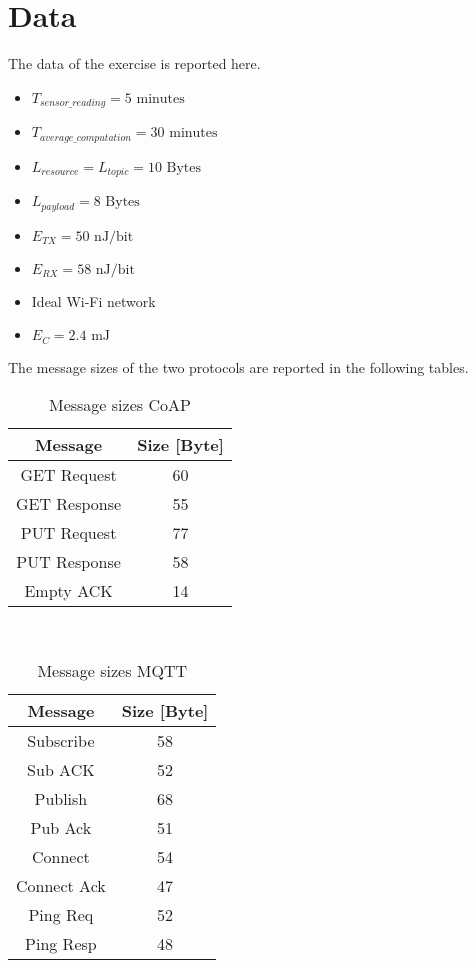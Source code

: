 \section{Data}

The data of the exercise is reported here.
\begin{itemize}
	\item $T_{sensor\_reading} = 5 \text{ minutes}$
	\item $T_{average\_computation} = 30 \text{ minutes}$
	\item $L_{resource} = L_{topic} = 10  \text{ Bytes}$
	\item $L_{payload} = 8  \text{ Bytes}$
	\item $E_{TX} = 50 \text{ nJ/bit}$
	\item $E_{RX} = 58 \text{ nJ/bit}$
	\item Ideal Wi-Fi network 
	\item $E_{C} = 2.4 \text{ mJ}$
\end{itemize}

The message sizes of the two protocols are reported in the following tables.

\begin{table}[H]
\centering 
\begin{tabular}{| c | c |}
	\hline 
	\rowcolor{bluepoli!40}
	\textbf{Message} & \textbf{Size [Byte]}\T\B \\
	\hline 
	GET Request & 60 \T\B\\
	GET Response  & 55 \T\B\\
	PUT Request & 77 \T\B\\
	PUT Response & 58 \T\B\\
	Empty ACK & 14 \T\B\\
	\hline
\end{tabular}
\\[10pt]
\caption{Message sizes CoAP}
\end{table}

\begin{table}[H]
\centering 
\begin{tabular}{| c | c |}
	\hline 
	\rowcolor{bluepoli!40}
	\textbf{Message} & \textbf{Size [Byte]}\T\B \\
	\hline 
	Subscribe & 58 \T\B\\
	Sub ACK & 52 \T\B\\
	Publish & 68 \T\B\\
	Pub Ack & 51 \T\B\\
	Connect & 54\T\B\\
	Connect Ack & 47 \T\B\\
	Ping Req & 52 \T\B\\
	Ping Resp & 48 \T\B\\
	\hline
\end{tabular}
\\[10pt]
\caption{Message sizes MQTT}
\end{table}

